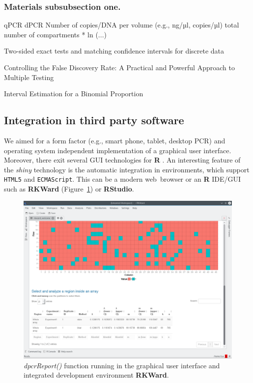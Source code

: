 \documentclass[a4,center,fleqn]{NAR}
\begin{document}
\subsubsection{Materials subsubsection one.}


qPCR	dPCR
Number of copies/DNA per volume (e.g., ng/µl, copies/µl)	total number of compartments * ln (...)



Two-sided exact tests and matching confidence intervals for discrete data \cite{fay_2010}

Controlling the False Discovery Rate: A Practical and Powerful Approach to Multiple Testing \cite{benjamini_1995}

Interval Estimation for a Binomial Proportion \cite{brown_2001}

\subsection{Integration in third party software}

We aimed for a form factor (e.g., smart phone, tablet, desktop PCR) and 
operating system independent implementation of a graphical user interface. 
Moreover, there exit several GUI technologies for \textbf{R} 
\cite{rodiger_rkward_2012}. An interesting feature of the \textit{shiny} 
technology is the automatic integration in environments, which support 
\texttt{HTML5} and \texttt{ECMAScript}. This can be a modern web~browser or an 
\textbf{R} IDE/GUI such as \textbf{RKWard} (Figure~\ref{GUI_RKWard_1}) or 
\textbf{RStudio}.

\begin{figure}[t]
\begin{center}
\includegraphics[width=17cm]{GUI_RKWard_1.png}
\end{center}
\caption{\textit{dpcrReport()} function running in the graphical user interface and integrated development environment \textbf{RKWard}.}
\label{GUI_RKWard_1}
\end{figure}
\end{document}

